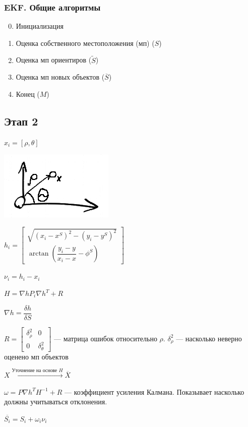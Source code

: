 \documentclass[12pt]{article}
\begin{document}
\subsubsection{EKF. Общие алгоритмы}
\begin{enumerate}
    \setcounter{enumi}{-1}
    \item Инициализация
    \item Оценка собственного местоположения (мп) ($S$)
    \item Оценка мп ориентиров ($\widetilde{S}$)
    \item Оценка мп новых объектов ($\overline{S}$)
    \item Конец ($M$)
\end{enumerate}

\subsection{Этап 2}
$x_i = [\rho, \theta]$

\includegraphics[height=0.1\textheight]{graphics/pic04.png}

$h_i = \begin{bmatrix}
        \sqrt{(x_i - x^S)^2 - (y_i - y^S)^2} \\ \arctan (\dfrac{y_i - y}{x_i - x} - \phi^S)
    \end{bmatrix}$

$\nu_i = h_i - x_i$

$H = \nabla h P_i \nabla h^T + R$

$\nabla h = \dfrac{\delta h}{\delta S}$

$R = \begin{bmatrix}\delta_\rho^2 & 0 \\ 0 & \delta_\theta^2\end{bmatrix}$ — матрица ошибок относительно $\rho$. $\delta^2_\rho$ — насколько неверно оценено мп объектов

$X \xrightarrow{\text{Уточнение на основе $H$}} \overline{X}$

$\omega = P \nabla h^T H^{-1} + R$ — коэффициент усиления Калмана. Показывает насколько должны учитываться отклонения.

$\overline{S_i} = S_i + \omega_i \nu_i$
\end{document}
